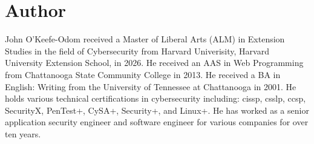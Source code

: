 \chapter*{Author}

John O\string'Keefe-Odom received a Master of Liberal Arts (ALM) in Extension Studies in the field of Cybersecurity from Harvard Univerisity, Harvard University Extension School, in 2026.  He received an AAS in Web Programming from Chattanooga State Community College in 2013.  He received a BA in English:  Writing from the University of Tennessee at Chattanooga in 2001.  He holds various technical certifications in cybersecurity including:  \gls{cissp}, \gls{csslp}, \gls{ccsp}, SecurityX, PenTest+, CySA+, Security+, and Linux+.  He has worked as a senior application security engineer and software engineer for various companies for over ten years.